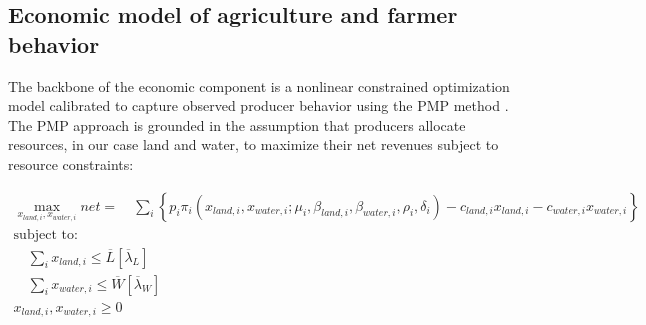 \subsection{Economic model of agriculture and farmer behavior}

The backbone of the economic component is a nonlinear constrained optimization model calibrated to capture observed producer behavior using the PMP method \citep{Howitt1995}. The PMP approach is grounded in the assumption that producers allocate resources, in our case land and water, to maximize their net revenues subject to resource constraints:


\begin{multline}\label{eq:net_revs}
        \max_{ x_{land,i} , x_{water,i} } net = \quad \sum_i \left\{ p_i \pi_i\left( x_{land,i}, x_{water,i}; \mu_i, \beta_{land,i},\beta_{water,i}, \rho_{i}, \delta_{i} \right) -  c_{land,i} x_{land,i} - c_{water,i} x_{water,i} \right\} \\
    \text{subject to: }\\ 
    \quad\sum_{i} x_{land,i} \leq \overline{L} \left[ \overline{ \lambda }_{L} \right]\\
    \quad\sum_{i} x_{water,i} \leq \overline{W} \left[ \overline{ \lambda }_{W} \right]\\
    x_{land,i} , x_{water,i} \geq 0\\
\end{multline}

